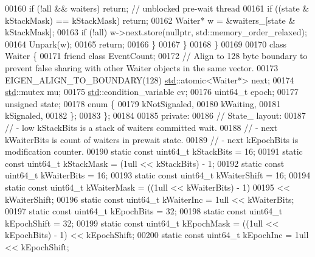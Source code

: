 \begin{DoxyCode}
{00160         \textcolor{keywordflow}{if} (!all && waiters) \textcolor{keywordflow}{return};  \textcolor{comment}{// unblocked pre-wait thread}
00161         \textcolor{keywordflow}{if} ((state & kStackMask) == kStackMask) \textcolor{keywordflow}{return};
00162         Waiter* w = &waiters\_[state & kStackMask];
00163         \textcolor{keywordflow}{if} (!all) w->next.store(\textcolor{keyword}{nullptr}, std::memory\_order\_relaxed);
00164         Unpark(w);
00165         \textcolor{keywordflow}{return};
00166       \}
00167     \}
00168   \}
00169 
00170   \textcolor{keyword}{class }Waiter \{
00171     \textcolor{keyword}{friend} \textcolor{keyword}{class }EventCount;
00172     \textcolor{comment}{// Align to 128 byte boundary to prevent false sharing with other Waiter objects in the same vector.}
00173     EIGEN\_ALIGN\_TO\_BOUNDARY(128) \hyperlink{namespacestd}{std}::atomic<Waiter*> next;
00174     \hyperlink{namespacestd}{std}::mutex mu;
00175     \hyperlink{namespacestd}{std}::condition\_variable cv;
00176     uint64\_t epoch;
00177     \textcolor{keywordtype}{unsigned} state;
00178     enum \{
00179       kNotSignaled,
00180       kWaiting,
00181       kSignaled,
00182     \};
00183   \};
00184 
00185  \textcolor{keyword}{private}:
00186   \textcolor{comment}{// State\_ layout:}
00187   \textcolor{comment}{// - low kStackBits is a stack of waiters committed wait.}
00188   \textcolor{comment}{// - next kWaiterBits is count of waiters in prewait state.}
00189   \textcolor{comment}{// - next kEpochBits is modification counter.}
00190   \textcolor{keyword}{static} \textcolor{keyword}{const} uint64\_t kStackBits = 16;
00191   \textcolor{keyword}{static} \textcolor{keyword}{const} uint64\_t kStackMask = (1ull << kStackBits) - 1;
00192   \textcolor{keyword}{static} \textcolor{keyword}{const} uint64\_t kWaiterBits = 16;
00193   \textcolor{keyword}{static} \textcolor{keyword}{const} uint64\_t kWaiterShift = 16;
00194   \textcolor{keyword}{static} \textcolor{keyword}{const} uint64\_t kWaiterMask = ((1ull << kWaiterBits) - 1)
00195                                       << kWaiterShift;
00196   \textcolor{keyword}{static} \textcolor{keyword}{const} uint64\_t kWaiterInc = 1ull << kWaiterBits;
00197   \textcolor{keyword}{static} \textcolor{keyword}{const} uint64\_t kEpochBits = 32;
00198   \textcolor{keyword}{static} \textcolor{keyword}{const} uint64\_t kEpochShift = 32;
00199   \textcolor{keyword}{static} \textcolor{keyword}{const} uint64\_t kEpochMask = ((1ull << kEpochBits) - 1) << kEpochShift;
00200   \textcolor{keyword}{static} \textcolor{keyword}{const} uint64\_t kEpochInc = 1ull << kEpochShift;
}
\end{DoxyCode}
